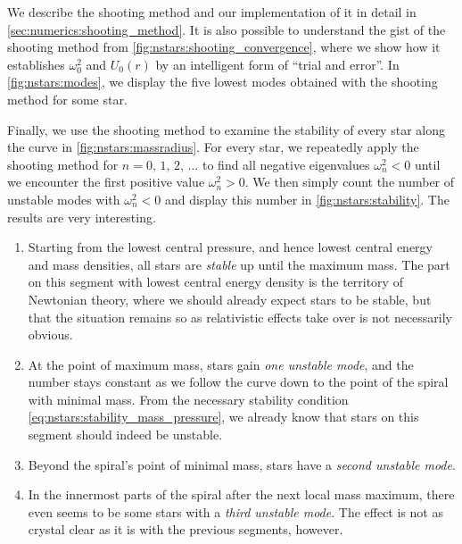 We describe the shooting method and our implementation of it in detail in \cref{sec:numerics:shooting_method}.
It is also possible to understand the gist of the shooting method from \cref{fig:nstars:shooting_convergence}, where we show how it establishes $\omega_0^2$ and $U_0(r)$ by an intelligent form of ``trial and error''.
In \cref{fig:nstars:modes}, we display the five lowest modes obtained with the shooting method for some star.

Finally, we use the shooting method to examine the stability of every star along the curve in \cref{fig:nstars:massradius}.
For every star, we repeatedly apply the shooting method for $n = 0, \, 1, \, 2, \, \ldots$ to find all negative eigenvalues $\omega_n^2 < 0$ until we encounter the first positive value $\omega_n^2 > 0$.
We then simply count the number of unstable modes with $\omega_n^2 < 0$ and display this number in \cref{fig:nstars:stability}.
The results are very interesting.
\begin{enumerate}
\item Starting from the lowest central pressure, and hence lowest central energy and mass densities, all stars are \emph{stable} up until the maximum mass.
      The part on this segment with lowest central energy density is the territory of Newtonian theory, where we should already expect stars to be stable, but that the situation remains so as relativistic effects take over is not necessarily obvious.
\item At the point of maximum mass, stars gain \emph{one unstable mode}, and the number stays constant as we follow the curve down to the point of the spiral with minimal mass.
      From the necessary stability condition \eqref{eq:nstars:stability_mass_pressure}, we already know that stars on this segment should indeed be unstable.
\item Beyond the spiral's point of minimal mass, stars have a \emph{second unstable mode}.
\item In the innermost parts of the spiral after the next local mass maximum, there even seems to be some stars with a \emph{third unstable mode}.
      The effect is not as crystal clear as it is with the previous segments, however.
\end{enumerate}

